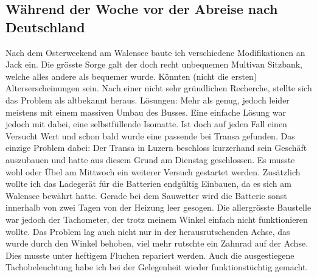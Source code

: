 \subsection{Während der Woche vor der Abreise nach Deutschland}
Nach dem Osterweekend am Walensee baute ich verschiedene Modifikationen an Jack ein.
Die grösste Sorge galt der doch recht unbequemen Multivan Sitzbank, welche alles andere als bequemer wurde.
Könnten (nicht die ersten) Alterserscheinungen sein.
Nach einer nicht sehr gründlichen Recherche, stellte sich das Problem als altbekannt heraus.
Lösungen: Mehr als genug, jedoch leider meistens mit einem massiven Umbau des Busses.
Eine einfache Lösung war jedoch mit dabei, eine selbstfüllende Isomatte.
Ist doch auf jeden Fall einen Versucht Wert und schon bald wurde eine passende bei Transa gefunden.
Das einzige Problem dabei: Der Transa in Luzern beschloss kurzerhand sein Geschäft auszubauen und hatte aus diesem Grund am Dienstag geschlossen.
Es musste wohl oder Übel am Mittwoch ein weiterer Versuch gestartet werden.
Zusätzlich wollte ich das Ladegerät für die Batterien endgültig Einbauen, da es sich am Walensee bewährt hatte.
Gerade bei dem Sauwetter wird die Batterie sonst innerhalb von zwei Tagen von der Heizung leer gesogen.
Die allergrösste Baustelle war jedoch der Tachometer, der trotz meinem Winkel einfach nicht funktionieren wollte.
Das Problem lag auch nicht nur in der herausrutschenden Achse, das wurde durch den Winkel behoben, viel mehr rutschte ein Zahnrad auf der Achse.
Dies musste unter heftigem Fluchen repariert werden.
Auch die ausgestiegene Tachobeleuchtung habe ich bei der Gelegenheit wieder funktionstüchtig gemacht. 

